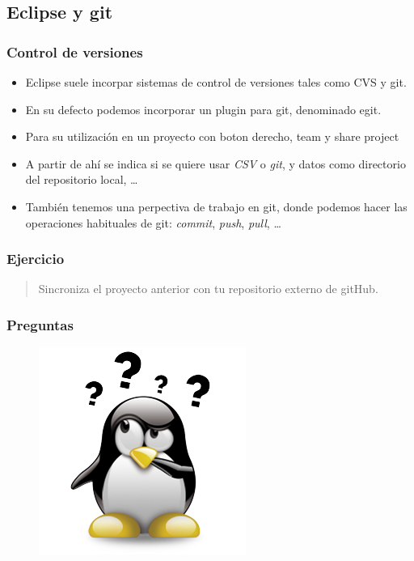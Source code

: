 \documentclass{beamer}
\begin{document}
\subsection{Eclipse y git}
\begin{frame}
\frametitle{Control de versiones}
\begin{itemize}[<+->]
\item Eclipse suele incorpar sistemas de control de versiones tales como CVS y git.
\item En su defecto podemos incorporar un plugin para git, denominado egit.
\item Para su utilización en un proyecto con boton derecho, team y share project
\item A partir de ahí se indica si se quiere usar \emph{CSV} o \textit{git}, y datos como directorio del repositorio local, \dots
\item También tenemos una perpectiva de trabajo en git, donde podemos hacer las operaciones habituales de git: \emph{commit}, \emph{push}, \textit{pull}, \dots
\end{itemize}
\end{frame}

\begin{frame}
\frametitle{Ejercicio}
\begin{verse}
\begin{LARGE}
Sincroniza el proyecto anterior con tu repositorio externo de gitHub.

\end{LARGE}\end{verse}
\end{frame}

\begin{frame}
\frametitle{Preguntas} 
\begin{figure}
\includegraphics[scale=0.9]{imagenes/dudas.png} 
\end{figure} 
\end{frame}
\end{document}
